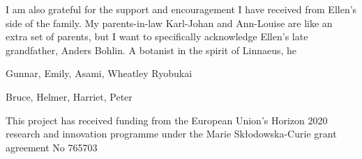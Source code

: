 I am also grateful for the support and encouragement I have received from Ellen's side of the family. My parents-in-law Karl-Johan and Ann-Louise are like an extra set of parents, but I want to specifically acknowledge Ellen's late grandfather, Anders Bohlin. A botanist in the spirit of Linnaeus, he  

Gunnar, Emily, Asami, Wheatley Ryobukai

Bruce, Helmer, Harriet, Peter




This project has received funding from the European Union’s Horizon 2020 research and innovation programme under the Marie Skłodowska-Curie grant agreement No 765703
